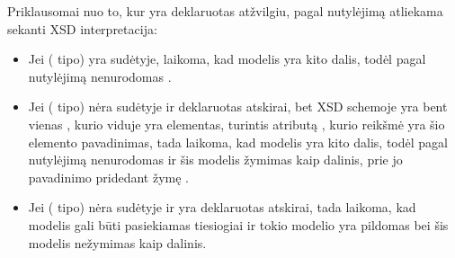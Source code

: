 \documentclass[letterpaper,10pt,lithuanian]{sphinxmanual}
\begin{document}
\sphinxAtStartPar
Priklausomai nuo to, kur {\hyperref[\detokenize{schemos/xsd:xsd-element}]{}} yra deklaruotas
{\hyperref[\detokenize{schemos/xsd:xsd-complextype}]{}} atžvilgiu, pagal nutylėjimą atliekama sekanti XSD
interpretacija:
\begin{itemize}
\item {} 
\sphinxAtStartPar
Jei {\hyperref[\detokenize{schemos/xsd:xsd-element}]{}} ({\hyperref[\detokenize{schemos/xsd:xsd-complextype}]{}} tipo) yra {\hyperref[\detokenize{schemos/xsd:xsd-complextype}]{}} sudėtyje, laikoma, kad
modelis yra kito {\hyperref[\detokenize{identifikatoriai:ref-denorm}]{}} dalis, todėl pagal nutylėjimą nenurodomas
.

\item {} 
\sphinxAtStartPar
Jei {\hyperref[\detokenize{schemos/xsd:xsd-element}]{}} ({\hyperref[\detokenize{schemos/xsd:xsd-complextype}]{}} tipo) nėra {\hyperref[\detokenize{schemos/xsd:xsd-complextype}]{}} sudėtyje ir deklaruotas
atskirai, bet XSD schemoje yra bent vienas , kurio viduje yra elementas, turintis
atributą , kurio reikšmė yra šio elemento pavadinimas, tada laikoma, kad modelis
yra kito {\hyperref[\detokenize{identifikatoriai:ref-denorm}]{}} dalis, todėl pagal nutylėjimą nenurodomas {\hyperref[\detokenize{dimensijos:model.source}]{}} ir
šis modelis žymimas kaip dalinis, prie jo pavadinimo pridedant žymę .

\item {} 
\sphinxAtStartPar
Jei {\hyperref[\detokenize{schemos/xsd:xsd-element}]{}} ({\hyperref[\detokenize{schemos/xsd:xsd-complextype}]{}} tipo) nėra {\hyperref[\detokenize{schemos/xsd:xsd-complextype}]{}} sudėtyje ir yra deklaruotas
atskirai, tada laikoma, kad modelis gali būti pasiekiamas tiesiogiai ir tokio
modelio {\hyperref[\detokenize{dimensijos:model.source}]{}} yra pildomas bei šis modelis nežymimas kaip dalinis.


\end{itemize}
\end{document}
